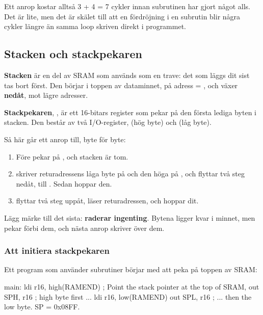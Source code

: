 \noindent Ett anrop kostar alltså 3 + 4 = 7 cykler innan subrutinen har gjort något alls. Det är
lite, men det är skälet till att en fördröjning i en subrutin blir några cykler längre än samma
loop skriven direkt i programmet.

\subsection{Stacken och stackpekaren}
\label{c10:c3}
\textbf{Stacken} är en del av SRAM som används som en trave: det som läggs dit sist tas bort först.
Den börjar i toppen av dataminnet, på adress  = , och växer
\textbf{nedåt}, mot lägre adresser.

\textbf{Stackpekaren}, , är ett 16-bitars register som pekar på den första lediga byten i
stacken. Den består av två I/O-register,  (hög byte) och  (låg byte).

Så här går ett anrop till, byte för byte:
\begin{enumerate}
  \item Före  pekar  på , och stacken är tom.
  \item {} skriver returadressens låga byte på  och den höga på
    , och flyttar  två steg nedåt, till . Sedan hoppar den.
  \item {} flyttar  två steg uppåt, läser returadressen, och hoppar dit.
\end{enumerate}


Lägg märke till det sista:  \textbf{raderar ingenting}. Bytena ligger kvar i minnet, men
 pekar förbi dem, och nästa anrop skriver över dem.

\subsubsection{Att initiera stackpekaren}
Ett program som använder subrutiner börjar med att peka  på toppen av SRAM:

\begin{asmcode}
main:
    ldi r16, high(RAMEND)           ; Point the stack pointer at the top of SRAM,
    out SPH, r16                    ; high byte first ...
    ldi r16, low(RAMEND)
    out SPL, r16                    ; ... then the low byte. SP = 0x08FF.
\end{asmcode}

